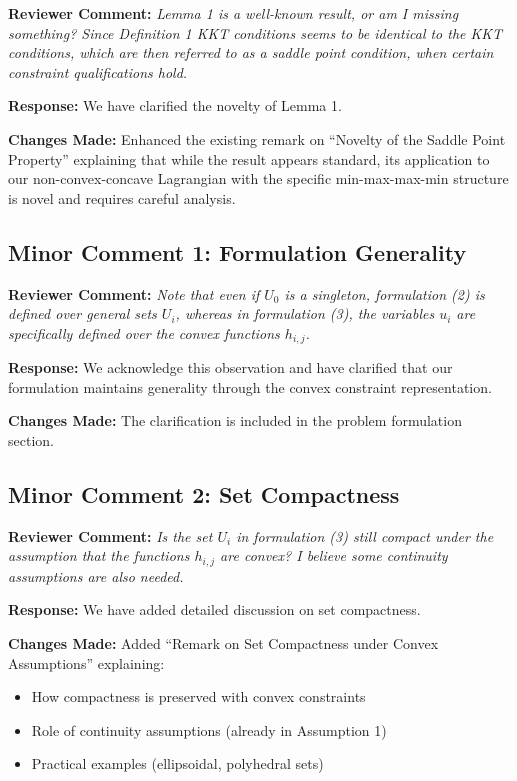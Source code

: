 \documentclass[11pt]{article}
\newcommand{\reviewercomment}[1]{\textbf{Reviewer Comment:} \textit{#1}}
\newcommand{\response}[1]{\textbf{Response:} #1}
\newcommand{\changes}[1]{\textbf{Changes Made:} #1}
\begin{document}
\reviewercomment{Lemma 1 is a well-known result, or am I missing something? Since Definition 1 KKT conditions seems to be identical to the KKT conditions, which are then referred to as a saddle point condition, when certain constraint qualifications hold.}

\response{We have clarified the novelty of Lemma 1.}

\changes{Enhanced the existing remark on ``Novelty of the Saddle Point Property'' explaining that while the result appears standard, its application to our non-convex-concave Lagrangian with the specific min-max-max-min structure is novel and requires careful analysis.}

\subsection*{Minor Comment 1: Formulation Generality}

\reviewercomment{Note that even if $U_0$ is a singleton, formulation (2) is defined over general sets $U_i$, whereas in formulation (3), the variables $u_i$ are specifically defined over the convex functions $h_{i,j}$.}

\response{We acknowledge this observation and have clarified that our formulation maintains generality through the convex constraint representation.}

\changes{The clarification is included in the problem formulation section.}

\subsection*{Minor Comment 2: Set Compactness}

\reviewercomment{Is the set $U_i$ in formulation (3) still compact under the assumption that the functions $h_{i,j}$ are convex? I believe some continuity assumptions are also needed.}

\response{We have added detailed discussion on set compactness.}

\changes{Added ``Remark on Set Compactness under Convex Assumptions'' explaining:
\begin{itemize}
\item How compactness is preserved with convex constraints
\item Role of continuity assumptions (already in Assumption 1)
\item Practical examples (ellipsoidal, polyhedral sets)
\end{itemize}
}
\end{document}
